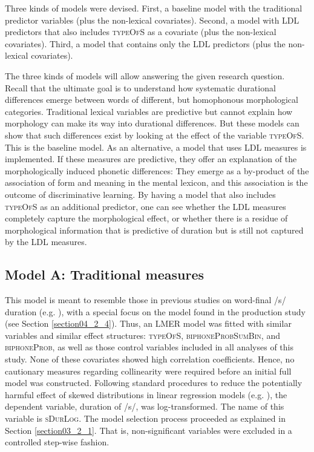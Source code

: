 Three kinds of models were devised. First, a baseline model with the traditional predictor variables (plus the non-lexical covariates). Second, a model with LDL predictors that also includes \textsc{typeOfS} as a covariate (plus the non-lexical covariates). Third, a model that contains only the LDL predictors (plus the non-lexical covariates).

The three kinds of models will allow answering the given research question. Recall that the ultimate goal is to understand how systematic durational differences emerge between words of different, but homophonous morphological categories. Traditional lexical variables are predictive but cannot explain how morphology can make its way into durational differences. But these models can show that such differences exist by looking at the effect of the variable \textsc{typeOfS}. This is the baseline model. As an alternative, a model that uses LDL measures is implemented. If these measures are predictive, they offer an explanation of the morphologically induced phonetic differences: They emerge as a by-product of the association of form and meaning in the mental lexicon, and this association is the outcome of discriminative learning. By having a model that also includes \textsc{typeOfS} as an additional predictor, one can see whether the LDL measures completely capture the morphological effect, or whether there is a residue of morphological information that is predictive of duration but is still not captured by the LDL measures.

\subsection{Model A: Traditional measures}\label{section05_2_4}

This model is meant to resemble those in previous studies on word-final /s/ duration (e.g. \cite{Plag2017}), with a special focus on the model found in the production study (see Section \ref{section04_2_4}). Thus, an LMER model was fitted with similar variables and similar effect structures: \textsc{typeOfS}, \textsc{biphoneProbSumBin}, and \textsc{biphoneProb}, as well as those control variables included in all analyses of this study. None of these covariates showed high correlation coefficients. Hence, no cautionary measures regarding collinearity were required before an initial full model was constructed. Following standard procedures to reduce the potentially harmful effect of skewed distributions in linear regression models (e.g. \cite{Winter2019}), the dependent variable, duration of /s/, was log-transformed. The name of this variable is \textsc{sDurLog}. The model selection process proceeded as explained in Section \ref{section03_2_1}. That is, non-significant variables were excluded in a controlled step-wise fashion. 

